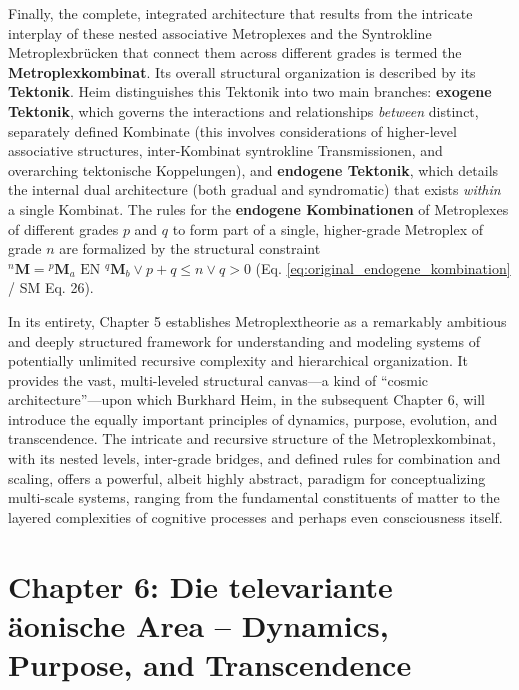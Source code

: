 \documentclass[12pt]{article}
\newcommand{\q}[1]{\enquote{#1}}
\newcommand{\metroplex}[1]{{}^{#1}\mathbf{M}}
\begin{document}
Finally, the complete, integrated architecture that results from the intricate interplay of these nested associative Metroplexes and the Syntrokline Metroplexbrücken that connect them across different grades is termed the \textbf{Metroplexkombinat}. Its overall structural organization is described by its \textbf{Tektonik}. Heim distinguishes this Tektonik into two main branches: \textbf{exogene Tektonik}, which governs the interactions and relationships \textit{between} distinct, separately defined Kombinate (this involves considerations of higher-level associative structures, inter-Kombinat syntrokline Transmissionen, and overarching tektonische Koppelungen), and \textbf{endogene Tektonik}, which details the internal dual architecture (both gradual and syndromatic) that exists \textit{within} a single Kombinat. The rules for the \textbf{endogene Kombinationen} of Metroplexes of different grades \( p \) and \( q \) to form part of a single, higher-grade Metroplex of grade \( n \) are formalized by the structural constraint \( \metroplex{n} = {\metroplex{p}_a} \text{ EN } {\metroplex{q}_b} \vee p+q \leq n \vee q > 0 \) (Eq. \eqref{eq:original_endogene_kombination} / SM Eq. 26).

In its entirety, Chapter 5 establishes Metroplextheorie as a remarkably ambitious and deeply structured framework for understanding and modeling systems of potentially unlimited recursive complexity and hierarchical organization. It provides the vast, multi-leveled structural canvas—a kind of \q{cosmic architecture}—upon which Burkhard Heim, in the subsequent Chapter 6, will introduce the equally important principles of dynamics, purpose, evolution, and transcendence. The intricate and recursive structure of the Metroplexkombinat, with its nested levels, inter-grade bridges, and defined rules for combination and scaling, offers a powerful, albeit highly abstract, paradigm for conceptualizing multi-scale systems, ranging from the fundamental constituents of matter to the layered complexities of cognitive processes and perhaps even consciousness itself.

\clearpage

\section{Chapter 6: Die televariante äonische Area – Dynamics, Purpose, and Transcendence}
\label{sec:chapter6}
\end{document}
